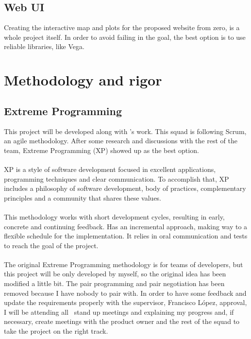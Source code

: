 \subsection{Web UI}

Creating the interactive map and plots for the proposed website from zero, is a whole project itself. In order to avoid failing in the \textit{} goal, the best option is to use reliable libraries, like Vega\cite{vega}.


\section{Methodology and rigor} \label{methodology_rigor}

\subsection{Extreme Programming} \label{xp}

This project will be developed along with \squad's work. This squad is following Scrum, an agile methodology. After some research and discussions with the rest of the team, Extreme Programming (XP)\cite{xp} showed up as the best option.
\\\\
XP is a style of software development focused in excellent applications, programming techniques and clear communication. To accomplish that, XP includes a philosophy of software development, body of practices, complementary principles and a community that shares these values.
\\\\
This methodology works with short development cycles, resulting in early, concrete and continuing feedback. Has an incremental approach, making way to a flexible schedule for the implementation. It relies in oral communication and tests to reach the goal of the project.
\\\\
The original Extreme Programming methodology is for teams of developers, but this project will be only developed by myself, so the original idea has been modified a little bit. The pair programming and pair negotiation has been removed because I have nobody to pair with. In order to have some feedback and update the requirements properly with the supervisor, Francisco López, approval, I will be attending all \squad\ stand up meetings and explaining my progress and, if necessary, create meetings with the product owner and the rest of the squad to take the project on the right track.

